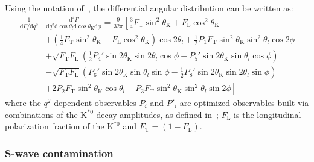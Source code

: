 Using the notation of~\cite{Ball2009}, the differential angular distribution can be written as:
\begin{equation} \label{eq:Angular}
  \begin{split}
    \frac{1}{\mathrm{d}\Gamma/\mathrm{d}q^2}&\frac{\mathrm{d}^4\Gamma}{\mathrm{d}q^2 \mathrm{d}\cos\theta_l \mathrm{d}\cos\theta_\mathrm{K} \mathrm{d}\phi} =\frac{9}{32\pi}\left[\frac{3}{4}F_\mathrm{T}\sin^2\theta_\mathrm{K} + F_\mathrm{L}\cos^2\theta_\mathrm{K} \right.\\
      &\left.+\left(\frac{1}{4}F_\mathrm{T}\sin^2\theta_\mathrm{K}-F_\mathrm{L}\cos^2\theta_\mathrm{K}\right)\cos2\theta_l+\frac{1}{2}P_1F_\mathrm{T}\sin^2\theta_\mathrm{K}\sin^2\theta_l\cos 2\phi \right.\\
      &+\sqrt{F_\mathrm{T}F_\mathrm{L}}\left(\frac{1}{2}P_4'\sin2\theta_\mathrm{K}\sin2\theta_l\cos\phi+P_5'\sin2\theta_\mathrm{K}\sin\theta_l\cos\phi \right)\\
      &-\sqrt{F_\mathrm{T}F_\mathrm{L}}\left(P_6'\sin2\theta_\mathrm{K}\sin\theta_l\sin\phi-\frac{1}{2}P_8'\sin2\theta_\mathrm{K}\sin2\theta_l\sin\phi \right)\\
      &\left.+2P_2F_\mathrm{T}\sin^2\theta_\mathrm{K}\cos\theta_l-P_3F_\mathrm{T}\sin^2\theta_\mathrm{K}\sin^2\theta_l\sin2\phi \right]
  \end{split}
\end{equation}
where the $q^2$ dependent observables $P_i$ and $P'_i$ are optimized observables built via combinations of the $\text{K}^{*0}$ decay amplitudes, as defined in~\cite{Genon:Swave}; $F_\mathrm{L}$ is the longitudinal polarization fraction of the $\text{K}^{*0}$ and $F_\mathrm{T}=(1-F_\mathrm{L})$.

\subsubsection{S-wave contamination}
\label{sec:S-waveform}

